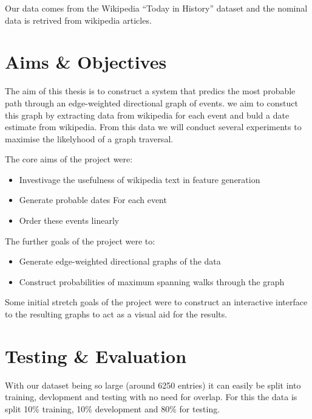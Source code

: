 \documentclass[bsc,frontabs,twoside,singlespacing,parskip,deptreport]{infthesis}     %
\begin{document}
Our data comes from the Wikipedia ``Today in History'' dataset and the nominal data is retrived
from wikipedia articles.

\section{Aims \& Objectives}
The aim of this thesis is to construct a system that predics the most probable path
through an edge-weighted directional graph of events.
we aim to constuct this graph by extracting data from wikipedia for each event and
buld a date estimate from wikipedia. From this data we will conduct several experiments
to maximise the likelyhood of a graph traversal.


The core aims of the project were: 
\begin{itemize}
  \item Investivage the usefulness of wikipedia text in feature generation
  \item Generate probable dates For each event
  \item Order these events linearly
\end{itemize}

The further goals of the project were to:
\begin{itemize}
  \item Generate edge-weighted directional graphs of the data
  \item Construct probabilities of maximum spanning walks through the graph
\end{itemize}

Some initial stretch goals of the project were to construct an interactive
interface to the resulting graphs to act as a visual aid for the results.

\section{Testing \& Evaluation}
With our dataset being so large (around 6250 entries) it can
easily be split into training, devlopment and testing with no
need for overlap. For this the data is split 10\% training,
10\% development and 80\% for testing.
\end{document}
